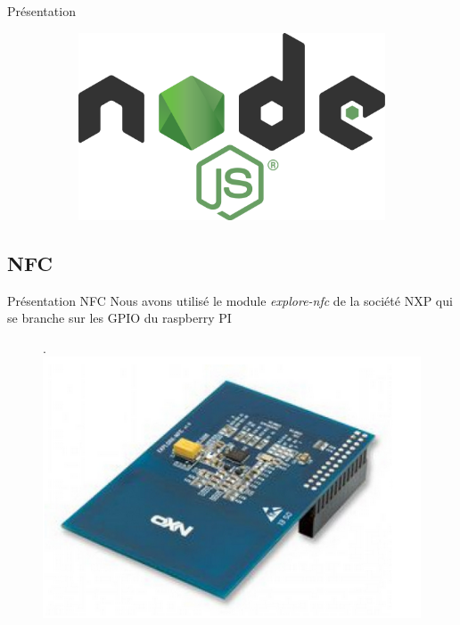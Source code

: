 \documentclass[aspectratio=169]{beamer}
\begin{document}
\begin{frame}{Présentation}
\begin{figure}
\begin{subfigure}{.2\textwidth}
    \end{subfigure}
    \begin{subfigure}{.2\textwidth}
      \centering
      \includegraphics[width=.8\linewidth]{../assets/nodejs.png}
    \end{subfigure}
  \end{figure}
\end{frame}

\subsection{NFC}

\begin{frame}{Présentation NFC}
  Nous avons utilisé le module \textit{explore-nfc} de la société NXP qui se branche sur les GPIO du raspberry PI
  \begin{figure}. 
      \includegraphics[width=.5\textwidth]{../assets/explorenfc.png}
  \end{figure}  
\end{frame} 
\end{document}
